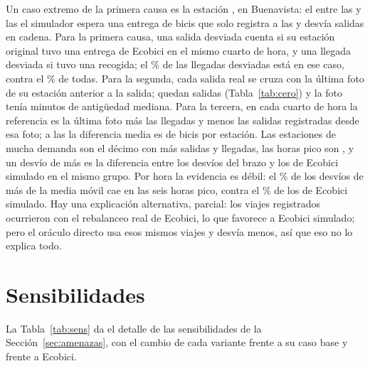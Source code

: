\documentclass[conference,letterpaper,10pt]{IEEEtran}
\newcommand{\EF}{E+F}
\begin{document}
Un caso extremo de la primera causa es la estación \rejEst, en Buenavista: el \rejDia{} entre las \rejDesde{} y las \rejHasta{} el simulador espera una entrega de \rejMovB{} bicis que solo registra a las \rejMovBHora{} y desvía \rejDesv{} salidas en cadena. Para la primera causa, una salida desviada cuenta si su estación original tuvo una entrega de Ecobici en el mismo cuarto de hora, y una llegada desviada si tuvo una recogida; el \rcUnoLle\% de las llegadas desviadas está en ese caso, contra el \rcUnoTLle\% de todas. Para la segunda, cada salida real se cruza con la última foto de su estación anterior a la salida; quedan \rcDosSalidas{} salidas (Tabla~\ref{tab:cero}) y la foto tenía \rcDosEdad{} minutos de antigüedad mediana. Para la tercera, en cada cuarto de hora la referencia es la última foto más las llegadas y menos las salidas registradas desde esa foto; a las \rcTresPicoHora{} la diferencia media es de \rcTresPicoDif{} bicis por estación. Las estaciones de mucha demanda son el décimo con más salidas y llegadas, las horas pico son \rdPicoHoras, y un desvío de más es la diferencia entre los desvíos del brazo y los de Ecobici simulado en el mismo grupo. Por hora la evidencia es débil: el \rdMaExtraPico\% de los desvíos de más de la media móvil cae en las seis horas pico, contra el \rdEcoPico\% de los de Ecobici simulado. Hay una explicación alternativa, parcial: los viajes registrados ocurrieron con el rebalanceo real de Ecobici, lo que favorece a Ecobici simulado; pero el oráculo directo usa esos mismos viajes y desvía menos, así que eso no lo explica todo.

\begin{table}[H]
\centering\footnotesize
\setlength{\tabcolsep}{4pt}
\caption{Salidas reales desde una estación que la última foto marcaba con 0 disponibles. Con no rent.: de esas, las de estaciones con no rentables. Antig.: antigüedad mediana de la foto.}
\label{tab:cero}

\end{table}

\section{Sensibilidades}\label{ap:sens}
La Tabla~\ref{tab:sens} da el detalle de las sensibilidades de la Sección~\ref{sec:amenazas}, con el cambio de cada variante frente a su caso base y frente a Ecobici.

\begin{table}[H]
\centering\footnotesize
\setlength{\tabcolsep}{5pt}
\caption{Sensibilidades en los \cxDias{} días de prueba. $\EF$ en minutos-estación por día. Cambio: de la media móvil frente a su caso base, $\pm$ semiancho del IC95 $t$ pareado por día; vs.\ Ecobici: $\EF$ de la media móvil frente al de Ecobici, en porcentaje; última columna: cambio del oráculo directo. Caso base: entrega a los \rdelMin{} min.}
\label{tab:sens}

\end{table}
\end{document}
